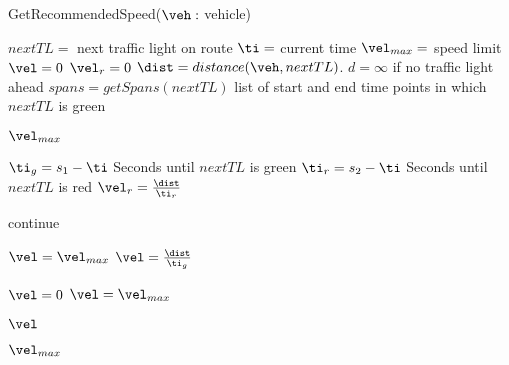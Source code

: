 \begin{algorithm}
\caption{GetRecommendedSpeed($\veh:$ vehicle)}\label{alg.recommendedSpeed}
\begin{algorithmic}[1]
\State $nextTL= $ next traffic light on route \label{alg:recSpeed:initStart}
\State $\ti=$ current time
\State $\vel_{max} = $ speed limit
\State $\vel = 0$
\State $\vel_r = 0$ 
\State $\dist=distance(\veh,nextTL)$. $d=\infty$ if no traffic light ahead\label{alg:recSpeed:initEnd}
\State $spans = getSpans(nextTL)$ \Comment list of start and end time points in which $nextTL$ is green

\Return $\vel_{max}$ \label{alg:recSpeed:maxSpeed}
\EndIf

\label{alg:recSpeed:loopSpans}
\State $\ti_g = s_1 - \ti$ \Comment Seconds until $nextTL$ is green \label{alg:recSpeed:tg}
\State $\ti_r = s_2 - \ti$ \Comment Seconds until $nextTL$ is red\label{alg:recSpeed:tr}
\State $\vel_r = \frac{\dist}{\ti_r}$\label{alg:recSpeed:hr}

\label{alg:recSpeed:continue}
\State continue
\EndIf

\label{alg:recSpeed:green}
\State $\vel=\vel_{max}$
\Else
\State $\vel = \frac{\dist}{\ti_g}$\label{alg:recSpeed:h}
\EndIf

\label{alg:recSpeed:h0} %
\State $\vel = 0$
\State $\vel=\vel_{max}$
\EndIf\label{alg:recSpeed:hmax}

\State\Return $\vel$\label{alg:recSpeed:returnh}
\EndFor

\State\Return $\vel_{max}$\label{alg:recSpeed:returnmax}

\end{algorithmic}
\end{algorithm}
